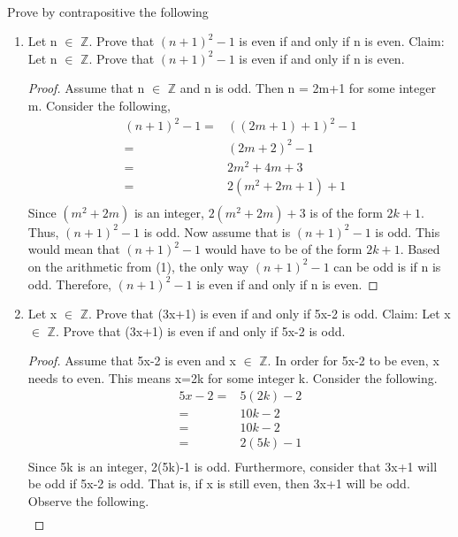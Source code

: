\documentclass[12pt]{article}
\newenvironment{problem}[2][Problem]{\begin{trivlist}
\item[\hskip \labelsep {\bfseries #1}\hskip \labelsep {\bfseries #2.}]}{\end{trivlist}}
\begin{document}
\begin{problem}{5}
\text{ }\\
Prove by contrapositive the following
\end{problem}
\begin{enumerate}
\item Let n $\in$ $\mathbb{Z}$. Prove that $(n+1)^2-1$ is even if and only if n is even.\newline \newline
Claim: Let n $\in$ $\mathbb{Z}$. Prove that $(n+1)^2-1$ is even if and only if n is even.
\begin{proof}
Assume that n $\in$ $\mathbb{Z}$ and n is odd. Then n = 2m+1 for some integer m. Consider the following, 
\begin{align}
(n+1)^2-1=&((2m+1)+1)^2-1\\
\nonumber
=&(2m+2)^2-1\\
\nonumber
=&2m^2+4m+3\\
\nonumber
=&2(m^2+2m+1)+1\\
\nonumber
\end{align}
Since $(m^2 +2m)$ is an integer, $2(m^2+2m)+3$ is of the form $2k+1$. Thus, $(n+1)^2-1$ is odd. \newline
Now assume that is $(n+1)^2-1$ is odd. This would mean that $(n+1)^2-1$ would have to be of the form $2k+1$. Based on the arithmetic from (1), the only way $(n+1)^2-1$ can be odd is if n is odd. Therefore, $(n+1)^2-1$ is even if and only if n is even.
\end{proof}
\item Let x $\in$ $\mathbb{Z}$. Prove that (3x+1) is even if and only if 5x-2 is odd.\newline
Claim: Let x $\in$ $\mathbb{Z}$. Prove that (3x+1) is even if and only if 5x-2 is odd.
\begin{proof}
Assume that 5x-2 is even and x $\in$ $\mathbb{Z}$. In order for 5x-2 to be even, x needs to even. This means x=2k for some integer k. Consider the following.
\begin{align}
5x-2=&5(2k)-2\\
\nonumber
=&10k-2\\
\nonumber
=&10k-2\\
\nonumber
=&2(5k)-1\\
\nonumber
\end{align}
Since 5k is an integer, 2(5k)-1 is odd. Furthermore, consider that 3x+1 will be odd if 5x-2 is odd. That is, if x is still even, then 3x+1 will be odd. Observe the following. 
\begin{align}

\end{align}
\end{proof}
\end{enumerate}
\end{document}
